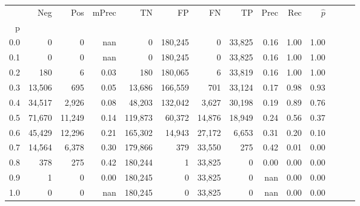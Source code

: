 \begin{tabular}{rrrrrrrrrrrrrr}
\toprule
{} &     Neg &     Pos & mPrec &       TN &       FP &      FN &      TP &  Prec &   Rec & $\hat{p}$ \\
p   &         &         &       &          &          &         &         &       &       &           \\
\midrule
0.0 &       0 &       0 &   nan &        0 &  180,245 &       0 &  33,825 &  0.16 &  1.00 &      1.00 \\
0.1 &       0 &       0 &   nan &        0 &  180,245 &       0 &  33,825 &  0.16 &  1.00 &      1.00 \\
0.2 &     180 &       6 &  0.03 &      180 &  180,065 &       6 &  33,819 &  0.16 &  1.00 &      1.00 \\
0.3 &  13,506 &     695 &  0.05 &   13,686 &  166,559 &     701 &  33,124 &  0.17 &  0.98 &      0.93 \\
0.4 &  34,517 &   2,926 &  0.08 &   48,203 &  132,042 &   3,627 &  30,198 &  0.19 &  0.89 &      0.76 \\
0.5 &  71,670 &  11,249 &  0.14 &  119,873 &   60,372 &  14,876 &  18,949 &  0.24 &  0.56 &      0.37 \\
0.6 &  45,429 &  12,296 &  0.21 &  165,302 &   14,943 &  27,172 &   6,653 &  0.31 &  0.20 &      0.10 \\
0.7 &  14,564 &   6,378 &  0.30 &  179,866 &      379 &  33,550 &     275 &  0.42 &  0.01 &      0.00 \\
0.8 &     378 &     275 &  0.42 &  180,244 &        1 &  33,825 &       0 &  0.00 &  0.00 &      0.00 \\
0.9 &       1 &       0 &  0.00 &  180,245 &        0 &  33,825 &       0 &   nan &  0.00 &      0.00 \\
1.0 &       0 &       0 &   nan &  180,245 &        0 &  33,825 &       0 &   nan &  0.00 &      0.00 \\
\bottomrule
\end{tabular}
